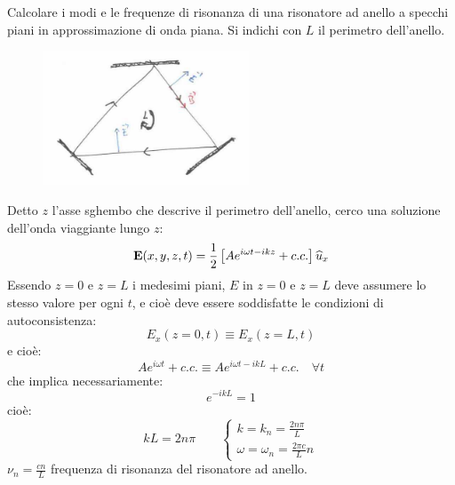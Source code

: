 \begin{example}
Calcolare i modi e le frequenze di risonanza di una risonatore ad anello a specchi piani in approssimazione di onda piana. Si indichi con $L$ il perimetro dell'anello.
\begin{figure}[H]
\centering
\includegraphics[height=4cm]{images/13}
\end{figure}
\noindent
Detto $z$ l'asse sghembo che descrive il perimetro dell'anello, cerco una soluzione dell'onda viaggiante lungo $z$:
\begin{equation*}
\mathbf{E}(x,y,z,t) = \frac{1}{2} \left[Ae^{i\omega t -ikz} + c.c. \right] \widehat{u}_x
\end{equation*}
Essendo $z=0$ e $z=L$ i medesimi piani, $E$ in $z=0$ e $z=L$ deve assumere lo stesso valore per ogni $t$, e cioè deve essere soddisfatte le condizioni di autoconsistenza:
\begin{equation*}
E_x(z=0,t) \equiv E_x(z=L, t)
\end{equation*}
e cioè:
\begin{equation*}
A e^{i\omega t} + c.c. \equiv A e^{i\omega t - ikL} + c.c. \quad \forall t
\end{equation*}
che implica necessariamente:
\begin{equation*}
e^{-ikL} = 1
\end{equation*}
cioè:
\begin{equation*}
kL = 2n\pi \qquad \begin{cases}
k = k_n = \frac{2n\pi}{L}\\
\omega = \omega_n = \frac{2\pi c}{L} n
\end{cases}
\end{equation*}
$\nu_n = \frac{cn}{L}$ frequenza di risonanza del risonatore ad anello.


\end{example}
